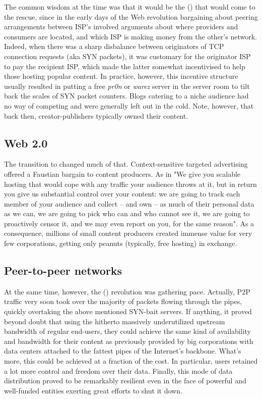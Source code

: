 The common wisdom at the time was that it would be the  () that would come to the rescue, since in the early days of the Web revolution bargaining about peering arrangements between ISP's involved arguments about where providers and consumers are located, and which ISP is making money from the other's network. Indeed, when there was a sharp disbalance between originators of TCP connection requests (aka SYN packets), it was customary for the originator ISP to pay the recipient ISP, which made the latter somewhat incentivised to help those hosting popular content. In practice, however, this incentive structure usually resulted in putting a free \emph{pr0n} or \emph{warez} server in the server room to tilt back the scales of SYN packet counters. Blogs catering to a niche audience had no way of competing and were generally left out in the cold. Note, however, that back then, creator-publishers typically owned their content.

\subsection{Web 2.0}\label{sec:web_2}

The transition to  changed much of that. Context-sensitive targeted advertising offered a Faustian bargain to content producers. As in "We give you scalable hosting that would cope with any traffic your audience throws at it, but in return you give us substantial control over your content: we are going to track each member of your audience and collect -- and own -- as much of their personal data as we can, we are going to pick who can and who cannot see it, we are going to proactively censor it, and we may even report on you, for the same reason". As a consequence, millions of small content producers created immense value for very few corporations, getting only peanuts (typically, free hosting) in exchange.

\subsection{Peer-to-peer networks}\label{sec:peer_to_peer}

At the same time, however, the  () revolution was gathering pace. Actually, P2P traffic very soon took over the majority of packets flowing through the pipes, quickly overtaking the above mentioned SYN-bait servers. If anything, it proved beyond doubt that using the hitherto massively underutilized upstream bandwidth of regular end-users, they could achieve the same kind of availability and bandwidth for their content as previously provided by big corporations with data centers attached to the fattest pipes of the Internet's backbone. What's more, this could be achieved at a fraction of the cost. In particular, users retained a lot more control and freedom over their data. Finally, this mode of data distribution proved to be remarkably resilient even in the face of powerful and well-funded entities exerting great efforts to shut it down.


